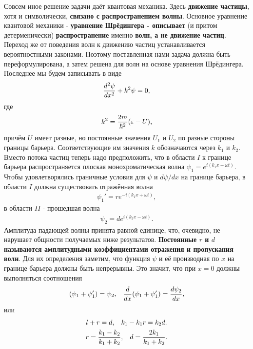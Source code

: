 \documentclass[__main__.tex]{subfiles}
\begin{document}
Совсем иное решение задачи даёт квантовая механика. Здесь \textbf{движение частицы}, хотя и символически, \textbf{связано с распространением волны}. Основное уравнение квантовой механики - \textbf{уравнение Шрёдингера - описывает} (и притом детерменически) \textbf{распространение} именно \textbf{волн, а не движение частиц}. Переход же от поведения волн к движению частиц устанавливается вероятностными законами. Поэтому поставленная нами задача должна быть переформулирована, а затем решена для волн на основе уравнения Шрёдингера. Последнее мы будем записывать в виде
\begin{gather}
\llabel{19-2b}
\frac{d^2\psi}{dx^2} + k^2\psi = 0,
\end{gather}
где
\begin{gather}
\llabel{19-3}
k^2 = \frac{2m}{\hbar^2}(\mathcal{\varepsilon} - U),
\end{gather}
причём $U$ имеет разные, но постоянные значения $U_1$ и $U_2$ по разные стороны границы барьера. Соответствующие им значения $k$ обозначаются через $k_1$ и $k_2$.\\
Вместо потока частиц теперь надо предположить, что в области $I$ к границе барьера распространяется плоская монохроматическая волна $\psi_1 = e^{i(k_1x-\omega t)}$.\\
Чтобы удовлетворялись граничные условия для $\psi$ и $d\psi/dx$ на границе барьера, в области $I$ должна существовать отражённая волна
\begin{gather*}
	\psi_1' = re^{-i(k_1x+\omega t)},
\end{gather*}
в области $II$ - прошедшая волна
\begin{gather*}
\psi_2 = de^{i(k_2x - \omega t)}.
\end{gather*}
Амплитуда падающей волны принята равной единице, что, очевидно, не нарушает общности получаемых ниже результатов. \textbf{Постоянные $r$ и $d$ называются амплитудными коэффициентами отражения и пропускания волн}. Для их определения заметим, что функция $\psi$ и её производная по $x$ на границе барьера должны быть непрерывны. Это значит, что при $x = 0$ должны выполняться соотношения
\begin{gather*}
(\psi_1 + \psi_1') = \psi_2, \hspace{3mm} \frac{d}{dx}(\psi_1 + \psi_1') = \frac{d\psi_2}{dx},
\end{gather*}
или
\begin{gather*}
l + r = d, \hspace{3mm} k_1 - k_1r = k_2d.\\
r = \frac{k_1-k_2}{k_1 + k_2}, \hspace{3mm} d = \frac{2k_1}{k_1 + k_2}.
\end{gather*}
\end{document}

